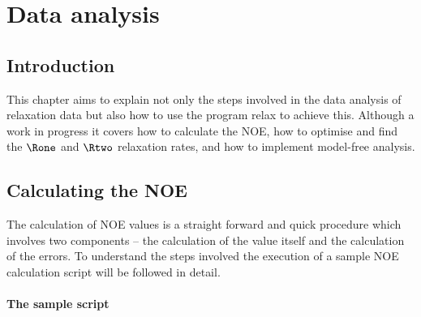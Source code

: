 
\chapter{Data analysis}




\section{Introduction}

This chapter aims to explain not only the steps involved in the data analysis of relaxation data but also how to use the program relax to achieve this.  Although a work in progress it covers how to calculate the NOE, how to optimise and find the $\Rone$ and $\Rtwo$ relaxation rates, and how to implement model-free analysis.



\section{Calculating the NOE}

The calculation of NOE values is a straight forward and quick procedure which involves two components -- the calculation of the value itself and the calculation of the errors.  To understand the steps involved the execution of a sample NOE calculation script will be followed in detail.


\subsubsection{The sample script}

